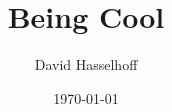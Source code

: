 %
%
%


\documentclass[12pt]{article} %


\usepackage[english]{babel} %
\usepackage{blindtext} %
\renewcommand{\familydefault}{\sfdefault} %
\usepackage{amsmath} %
\usepackage{graphicx} %
\usepackage[left=1in,right=1in,top=1in,bottom=1in]{geometry} %
\usepackage[colorinlistoftodos]{todonotes} %
\usepackage{fancyhdr} %
\usepackage{isotope} %
\usepackage{subcaption} %
\usepackage{mathtools} %
\setlength{\parindent}{0pt} %



\title{Being Cool}

\author{David Hasselhoff}

\date{\today}




\maketitle

